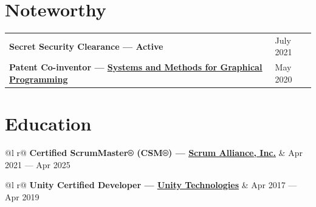 \documentclass[letterpaper,9pt]{extarticle}
\begin{document}
\section{Noteworthy}
\begin{tabularx}{\linewidth}{@{}l X@{}}
\textbf{Secret Security Clearance --- Active} & \hfill July 2021 \\[3.5pt]
\textbf{Patent Co-inventor --- \href{https://image-ppubs.uspto.gov/dirsearch-public/print/downloadPdf/10650611}{\underline{Systems and Methods for Graphical Programming}}} & \hfill May 2020 \\[3.5pt]
\end{tabularx}

\section{Education}

\begin{tabularx}{\linewidth}{ @{}l r@{} }
\textbf{Certified ScrumMaster® (CSM®) --- \href{https://www.scrumalliance.org/}{\underline{Scrum Alliance, Inc.}}} & \hfill Apr 2021 --- Apr 2025 \\[3.5pt]
\end{tabularx}

\begin{tabularx}{\linewidth}{ @{}l r@{} }
\textbf{Unity Certified Developer --- \href{https://unity.com/}{\underline{Unity Technologies}}} & \hfill Apr 2017 --- Apr 2019 \\[3.5pt]
\end{tabularx}
\end{document}
